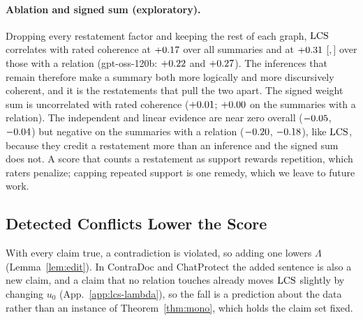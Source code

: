 \paragraph{Ablation and signed sum (exploratory).} Dropping every restatement factor and keeping
the rest of each graph, $\mathrm{LCS}$ correlates with rated coherence at $+0.17$ over
all summaries and at $+0.31$
{\scriptsize[\extSeNoRestateNonEmptyRhoCohGptLo,\,\extSeNoRestateNonEmptyRhoCohGptHi]} over those with
a relation (gpt-oss-120b: $+0.22$ and $+0.27$). The
inferences that remain therefore make a summary both more logically and more discursively
coherent, and it is the restatements that pull the two apart. The signed weight sum is uncorrelated with rated coherence ($+0.01$;
$+0.00$ on the summaries with a relation). The independent and linear evidence are
near zero overall ($-0.05$, $-0.04$) but negative on the summaries with a
relation ($-0.20$, $-0.18$), like $\mathrm{LCS}$, because they credit a
restatement more than an inference and the signed sum does not. A score that counts a restatement as support rewards repetition, which
raters penalize; capping repeated support is one remedy, which we leave to future work.

\subsection{Detected Conflicts Lower the Score}
\label{app:ext-contra}

With every claim true, a contradiction is violated, so adding one lowers $\Lambda$
(Lemma~\ref{lem:edit}). In ContraDoc and ChatProtect the added sentence is also a new claim, and a
claim that no relation touches already moves $\mathrm{LCS}$ slightly by changing $u_0$
(App.~\ref{app:lcs-lambda}), so the fall is a prediction about the data rather than an instance of
Theorem~\ref{thm:mono}, which holds the claim set fixed.

